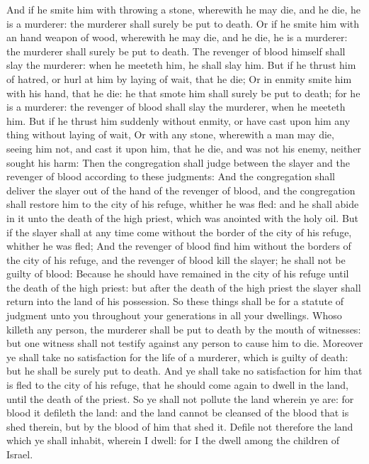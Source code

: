 \begin{biblechapter}
\verse And if he smite him with throwing a stone, wherewith he may die, and he die, he is a murderer: the murderer shall surely be put to death.
\verse Or if he smite him with an hand weapon of wood, wherewith he may die, and he die, he is a murderer: the murderer shall surely be put to death.
\verse The revenger of blood himself shall slay the murderer: when he meeteth him, he shall slay him.
\verse But if he thrust him of hatred, or hurl at him by laying of wait, that he die;
\verse Or in enmity smite him with his hand, that he die: he that smote him shall surely be put to death; for he is a murderer: the revenger of blood shall slay the murderer, when he meeteth him.
\verse But if he thrust him suddenly without enmity, or have cast upon him any thing without laying of wait,
\verse Or with any stone, wherewith a man may die, seeing him not, and cast it upon him, that he die, and was not his enemy, neither sought his harm:
\verse Then the congregation shall judge between the slayer and the revenger of blood according to these judgments:
\verse And the congregation shall deliver the slayer out of the hand of the revenger of blood, and the congregation shall restore him to the city of his refuge, whither he was fled: and he shall abide in it unto the death of the high priest, which was anointed with the holy oil.
\verse But if the slayer shall at any time come without the border of the city of his refuge, whither he was fled;
\verse And the revenger of blood find him without the borders of the city of his refuge, and the revenger of blood kill the slayer; he shall not be guilty of blood:
\verse Because he should have remained in the city of his refuge until the death of the high priest: but after the death of the high priest the slayer shall return into the land of his possession.
\verse So these things shall be for a statute of judgment unto you throughout your generations in all your dwellings.
\verse Whoso killeth any person, the murderer shall be put to death by the mouth of witnesses: but one witness shall not testify against any person to cause him to die.
\verse Moreover ye shall take no satisfaction for the life of a murderer, which is guilty of death: but he shall be surely put to death.
\verse And ye shall take no satisfaction for him that is fled to the city of his refuge, that he should come again to dwell in the land, until the death of the priest.
\verse So ye shall not pollute the land wherein ye are: for blood it defileth the land: and the land cannot be cleansed of the blood that is shed therein, but by the blood of him that shed it.
\verse Defile not therefore the land which ye shall inhabit, wherein I dwell: for I the \LORD dwell among the children of Israel.
\end{biblechapter}


